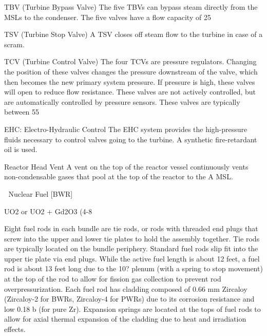 \documentclass[10pt]{article}
\begin{document}
TBV (Turbine Bypass Valve)
The five TBVs can bypass steam directly from the MSLs to the condenser. The five valves have a flow capacity of 25%

TSV (Turbine Stop Valve)
A TSV closes off steam flow to the turbine in case of a scram. 

TCV (Turbine Control Valve)
The four TCVs are pressure regulators. Changing the position of these valves changes the pressure downstream of the valve, which then becomes the new primary system pressure. If pressure is high, these valves will open to reduce flow resistance. These valves are not actively controlled, but are automatically controlled by pressure sensors. These valves are typically between 55%

EHC: Electro-Hydraulic Control
The EHC system provides the high-pressure fluids necessary to control valves going to the turbine. A synthetic fire-retardant oil is used. 

Reactor Head Vent
A vent on the top of the reactor vessel continuously vents non-condensable gases that pool at the top of the reactor to the A MSL. 


Nuclear Fuel [BWR]

UO2 or UO2 + Gd2O3 (4-8%

Eight fuel rods in each bundle are tie rods, or rods with threaded end plugs that screw into the upper and lower tie plates to hold the assembly together. Tie rods are typically located on the bundle periphery. Standard fuel rods slip fit into the upper tie plate via end plugs. While the active fuel length is about 12 feet, a fuel rod is about 13 feet long due to the 10? plenum (with a spring to stop movement) at the top of the rod to allow for fission gas collection to prevent rod overpressurization. Each fuel rod has cladding composed of 0.66 mm Zircaloy (Zircaloy-2 for BWRs, Zircaloy-4 for PWRs) due to its corrosion resistance and low  0.18 b (for pure Zr). Expansion springs are located at the tops of fuel rods to allow for axial thermal expansion of the cladding due to heat and irradiation effects. 
\end{document}

